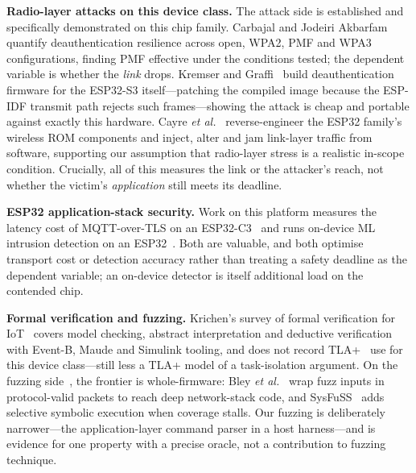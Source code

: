 \textbf{Radio-layer attacks on this device class.} The attack side is established and specifically
demonstrated on this chip family. Carbajal and Jodeiri Akbarfam~\cite{carbajal2026} quantify
deauthentication resilience across open, WPA2, PMF and WPA3 configurations, finding PMF effective
under the conditions tested; the dependent variable is whether the \emph{link} drops. Kremser and
Graffi~\cite{deauther2026} build deauthentication firmware for the ESP32-S3 itself---patching the
compiled image because the ESP-IDF transmit path rejects such frames---showing the attack is cheap
and portable against exactly this hardware. Cayre \emph{et al.}~\cite{espwn2023} reverse-engineer
the ESP32 family's wireless ROM components and inject, alter and jam link-layer traffic from
software, supporting our assumption that radio-layer stress is a realistic in-scope condition.
Crucially, all of this measures the link or the attacker's reach, not whether the victim's
\emph{application} still meets its deadline.

\textbf{ESP32 application-stack security.} Work on this platform measures the latency cost of
MQTT-over-TLS on an ESP32-C3~\cite{mqtttls2026} and runs on-device ML intrusion detection on an
ESP32~\cite{ondevice2026}. Both are valuable, and both optimise transport cost or detection
accuracy rather than treating a safety deadline as the dependent variable; an on-device detector is
itself additional load on the contended chip.

\textbf{Formal verification and fuzzing.} Krichen's survey of formal verification for
IoT~\cite{krichen2023} covers model checking, abstract interpretation and deductive verification
with Event-B, Maude and Simulink tooling, and does not record TLA+~\cite{lamport2002} use for this
device class---still less a TLA+ model of a task-isolation argument. On the fuzzing
side~\cite{fuzzsurvey2022}, the frontier is whole-firmware: Bley \emph{et al.}~\cite{pemu2025}
wrap fuzz inputs in protocol-valid packets to reach deep network-stack code, and
SysFuSS~\cite{sysfuss2026} adds selective symbolic execution when coverage stalls. Our fuzzing is
deliberately narrower---the application-layer command parser in a host harness---and is evidence
for one property with a precise oracle, not a contribution to fuzzing technique.

